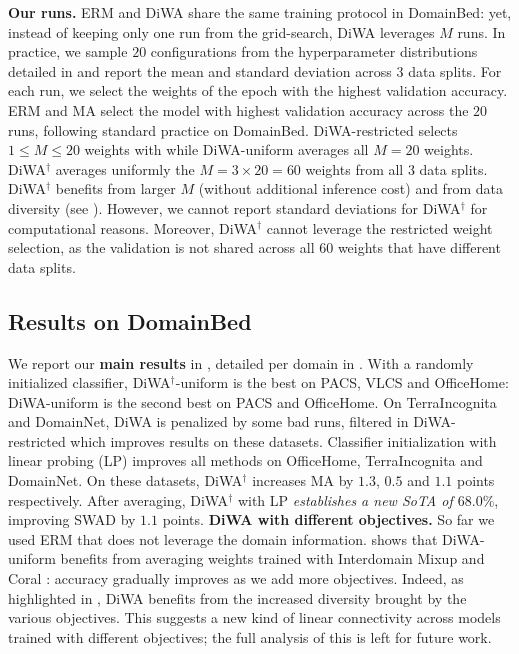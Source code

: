 \textbf{Our runs.}
ERM and DiWA share the same training protocol in DomainBed: yet, instead of keeping only one run from the grid-search, DiWA leverages $M$ runs.
In practice, we sample $20$ configurations from the hyperparameter distributions detailed in  and report the mean and standard deviation across $3$ data splits.
For each run, we select the weights of the epoch with the highest validation accuracy.
ERM and MA select the model with highest validation accuracy across the $20$ runs, following standard practice on DomainBed.
DiWA-restricted selects $1 \leq M \leq 20 $ weights with  while DiWA-uniform averages all $M=20$ weights.
DiWA$^{\dagger}$ averages uniformly the $M=3\times20=60$ weights from all $3$ data splits.
DiWA$^{\dagger}$ benefits from larger $M$ (without additional inference cost) and from data diversity (see ).
However, we cannot report standard deviations for DiWA$^{\dagger}$ for computational reasons. Moreover, DiWA$^{\dagger}$ cannot leverage the restricted weight selection, as the validation is not shared across all $60$ weights that have different data splits.

\subsection{Results on DomainBed}
\label{subsec:domain_bed}
We report our \textbf{main results} in , detailed per domain in .
With a randomly initialized classifier, DiWA$^\dagger$-uniform is the best on PACS, VLCS and OfficeHome:
DiWA-uniform is the second best on PACS and OfficeHome.
On TerraIncognita and DomainNet, DiWA is penalized by some bad runs, filtered in DiWA-restricted which improves results on these datasets.
Classifier initialization with linear probing (LP) \cite{kumar2022finetuning} improves all methods on OfficeHome, TerraIncognita and DomainNet.
On these datasets, DiWA$^\dagger$ increases MA by $1.3$, $0.5$ and $1.1$ points respectively.
After averaging, DiWA$^\dagger$ with LP \textit{establishes a new SoTA of $68.0\%$}, improving SWAD by $1.1$ points.%
%
\clearpage
%
\textbf{DiWA with different objectives.}
So far we used ERM that does not leverage the domain information.
 shows that DiWA-uniform benefits from averaging weights trained with Interdomain Mixup \cite{yan2020improve} and Coral \cite{coral216aaai}: accuracy gradually improves as we add more objectives.
Indeed, as highlighted in , DiWA benefits from the increased diversity brought by the various objectives.
This suggests a new kind of linear connectivity across models trained with different objectives; the full analysis of this is left for future work.%
\vspace{-0.2em}%
